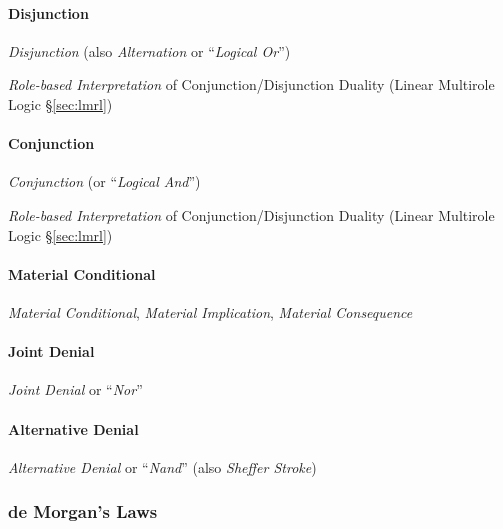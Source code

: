 \paragraph{Disjunction}\label{sec:disjunction}\hfill

\emph{Disjunction} (also \emph{Alternation} or ``\emph{Logical Or}'')

\fist \emph{Role-based Interpretation} of Conjunction/Disjunction
Duality (Linear Multirole Logic \S\ref{sec:lmrl})



\paragraph{Conjunction}\label{sec:conjunction}\hfill

\emph{Conjunction} (or ``\emph{Logical And}'')

\fist \emph{Role-based Interpretation} of Conjunction/Disjunction
Duality (Linear Multirole Logic \S\ref{sec:lmrl})



\paragraph{Material Conditional}\label{sec:material_conditional}\hfill

\emph{Material Conditional}, \emph{Material Implication},
\emph{Material Consequence}



\paragraph{Joint Denial}\label{sec:joint_denial}\hfill

\emph{Joint Denial} or ``\emph{Nor}''



\paragraph{Alternative Denial}\label{sec:alternative_denial}\hfill

\emph{Alternative Denial} or ``\emph{Nand}'' (also \emph{Sheffer
  Stroke})



\subsubsection{de Morgan's Laws}\label{sec:de_morgan}

